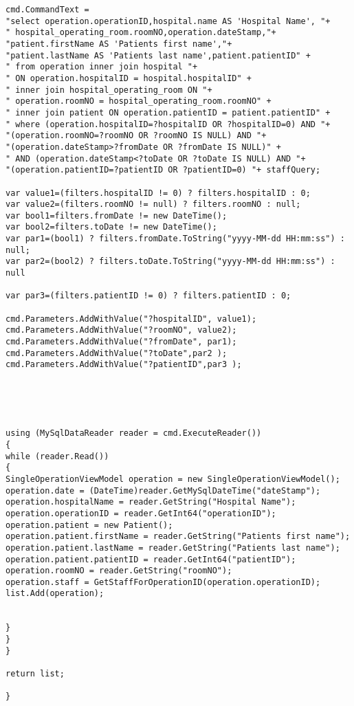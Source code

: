 \begin{lstlisting}
cmd.CommandText =
"select operation.operationID,hospital.name AS 'Hospital Name', "+
" hospital_operating_room.roomNO,operation.dateStamp,"+
"patient.firstName AS 'Patients first name',"+
"patient.lastName AS 'Patients last name',patient.patientID" +
" from operation inner join hospital "+
" ON operation.hospitalID = hospital.hospitalID" +
" inner join hospital_operating_room ON "+
" operation.roomNO = hospital_operating_room.roomNO" +
" inner join patient ON operation.patientID = patient.patientID" +
" where (operation.hospitalID=?hospitalID OR ?hospitalID=0) AND "+
"(operation.roomNO=?roomNO OR ?roomNO IS NULL) AND "+
"(operation.dateStamp>?fromDate OR ?fromDate IS NULL)" +
" AND (operation.dateStamp<?toDate OR ?toDate IS NULL) AND "+
"(operation.patientID=?patientID OR ?patientID=0) "+ staffQuery;

var value1=(filters.hospitalID != 0) ? filters.hospitalID : 0;
var value2=(filters.roomNO != null) ? filters.roomNO : null;
var bool1=filters.fromDate != new DateTime();
var bool2=filters.toDate != new DateTime();
var par1=(bool1) ? filters.fromDate.ToString("yyyy-MM-dd HH:mm:ss") : null;
var par2=(bool2) ? filters.toDate.ToString("yyyy-MM-dd HH:mm:ss") : null

var par3=(filters.patientID != 0) ? filters.patientID : 0;

cmd.Parameters.AddWithValue("?hospitalID", value1);
cmd.Parameters.AddWithValue("?roomNO", value2);
cmd.Parameters.AddWithValue("?fromDate", par1);
cmd.Parameters.AddWithValue("?toDate",par2 );
cmd.Parameters.AddWithValue("?patientID",par3 );





using (MySqlDataReader reader = cmd.ExecuteReader())
{
while (reader.Read())
{
SingleOperationViewModel operation = new SingleOperationViewModel();
operation.date = (DateTime)reader.GetMySqlDateTime("dateStamp");
operation.hospitalName = reader.GetString("Hospital Name");
operation.operationID = reader.GetInt64("operationID");
operation.patient = new Patient();
operation.patient.firstName = reader.GetString("Patients first name");
operation.patient.lastName = reader.GetString("Patients last name");
operation.patient.patientID = reader.GetInt64("patientID");
operation.roomNO = reader.GetString("roomNO");
operation.staff = GetStaffForOperationID(operation.operationID);
list.Add(operation);


}
}
}

return list;

}


\end{lstlisting}
